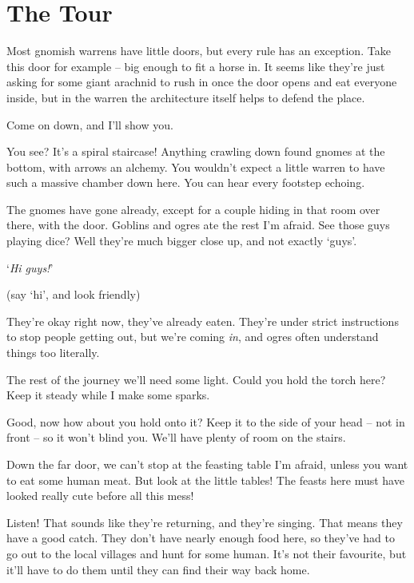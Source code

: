 \chapter{The Tour}

\begin{multicols}{2}
\setcounter{age}{0}

\begin{exampletext}
\noindent
Most gnomish warrens have little doors, but every rule has an exception.
Take this door for example -- big enough to fit a horse in.
It seems like they're just asking for some giant arachnid to rush in once the door opens and eat everyone inside, but in the \gls{warren} the architecture itself helps to defend the place.

Come on down, and I'll show you.

You see?
It's a spiral staircase!
Anything crawling down found gnomes at the bottom, with arrows an alchemy.
You wouldn't expect a little warren to have such a massive chamber down here.
You can hear every footstep echoing.


The gnomes have gone already, except for a couple hiding in that room over there, with the door.
Goblins and ogres ate the rest I'm afraid.
See those guys playing dice?
Well they're much bigger close up, and not exactly `guys'.

`\textit{Hi guys!}'

(say `hi', and look friendly)

They're okay right now, they've already eaten.
They're under strict instructions to stop people getting out, but we're coming \textit{in}, and ogres often understand things too literally.

The rest of the journey we'll need some light.
Could you hold the torch here?
Keep it steady while I make some sparks.

Good, now how about you hold onto it?
Keep it to the side of your head -- not in front -- so it won't blind you.
We'll have plenty of room on the stairs.

Down the far door, we can't stop at the feasting table I'm afraid, unless you want to eat some human meat.
But look at the little tables!
The feasts here must have looked really cute before all this mess!

Listen!
That sounds like they're returning, and they're singing.
That means they have a good catch.
They don't have nearly enough food here, so they've had to go out to the local \glspl{village} and hunt for some human.
It's not their favourite, but it'll have to do them until they can find their way back home.


\end{exampletext}
\end{multicols}
